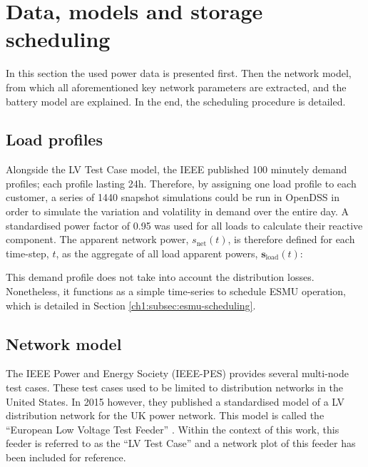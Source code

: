 \section{Data, models and storage scheduling}
\label{ch1:sec:data-and-network-models}

In this section the used power data is presented first.
Then the network model, from which all aforementioned key network parameters are extracted, and the battery model are explained.
In the end, the scheduling procedure is detailed.

\subsection{Load profiles}


Alongside the LV Test Case model, the IEEE published 100 minutely demand profiles; each profile lasting 24h.
Therefore, by assigning one load profile to each customer, a series of 1440 snapshot simulations could be run in OpenDSS in order to simulate the variation and volatility in demand over the entire day.
A standardised power factor of 0.95 was used for all loads to calculate their reactive component.
The apparent network power, $s_\text{net}(t)$, is therefore defined for each time-step, $t$, as the aggregate of all load apparent powers, $\textbf{s}_\text{load}(t)$:



This demand profile does not take into account the distribution losses.
Nonetheless, it functions as a simple time-series to schedule ESMU operation, which is detailed in Section \ref{ch1:subsec:esmu-scheduling}.

\subsection{Network model}
\label{ch1:subsec:standardised-network-model}

The IEEE Power and Energy Society (IEEE-PES) provides several multi-node test cases.
These test cases used to be limited to distribution networks in the United States.
In 2015 however, they published a standardised model of a LV distribution network for the UK power network.
This model is called the ``European Low Voltage Test Feeder'' \cite{DistributionTestFeeders2017}.
Within the context of this work, this feeder is referred to as the ``LV Test Case'' and a network plot of this feeder has been included for reference.


